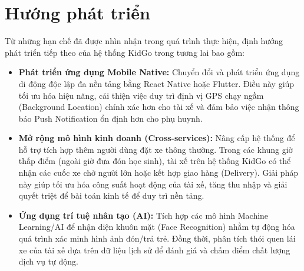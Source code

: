 \documentclass[../DoAn.tex]{subfiles}
\begin{document}
\section{Hướng phát triển}
Từ những hạn chế đã được nhìn nhận trong quá trình thực hiện, định hướng phát triển tiếp theo của hệ thống KidGo trong tương lai bao gồm:
\begin{itemize}
    \item \textbf{Phát triển ứng dụng Mobile Native:} Chuyển đổi và phát triển ứng dụng di động độc lập đa nền tảng bằng React Native hoặc Flutter. Điều này giúp tối ưu hóa hiệu năng, cải thiện việc duy trì định vị GPS chạy ngầm (Background Location) chính xác hơn cho tài xế và đảm bảo việc nhận thông báo Push Notification ổn định hơn cho phụ huynh.
    \item \textbf{Mở rộng mô hình kinh doanh (Cross-services):} Nâng cấp hệ thống để hỗ trợ tích hợp thêm người dùng đặt xe thông thường. Trong các khung giờ thấp điểm (ngoài giờ đưa đón học sinh), tài xế trên hệ thống KidGo có thể nhận các cuốc xe chở người lớn hoặc kết hợp giao hàng (Delivery). Giải pháp này giúp tối ưu hóa công suất hoạt động của tài xế, tăng thu nhập và giải quyết triệt để bài toán kinh tế để duy trì nền tảng.
    \item \textbf{Ứng dụng trí tuệ nhân tạo (AI):} Tích hợp các mô hình Machine Learning/AI để nhận diện khuôn mặt (Face Recognition) nhằm tự động hóa quá trình xác minh hình ảnh đón/trả trẻ. Đồng thời, phân tích thói quen lái xe của tài xế dựa trên dữ liệu lịch sử để đánh giá và chấm điểm chất lượng dịch vụ tự động.
\end{itemize}
\end{document}
